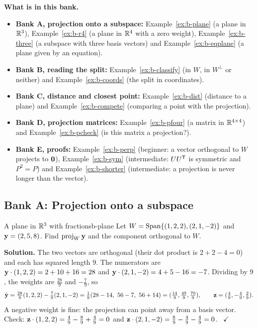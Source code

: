 \documentclass[11pt]{article}
\begin{document}
\textbf{What is in this bank.}
\begin{itemize}
  \item \textbf{Bank A, projection onto a subspace:} Example~\ref{ex:b-plane} (a plane in $\mathbb{R}^3$), Example~\ref{ex:b-r4} (a plane in $\mathbb{R}^4$ with a zero weight), Example~\ref{ex:b-three} (a subspace with three basis vectors) and Example~\ref{ex:b-eqplane} (a plane given by an equation).
  \item \textbf{Bank B, reading the split:} Example~\ref{ex:b-classify} (in $W$, in $W^{\perp}$ or neither) and Example~\ref{ex:b-coords} (the split in coordinates).
  \item \textbf{Bank C, distance and closest point:} Example~\ref{ex:b-dist} (distance to a plane) and Example~\ref{ex:b-compete} (comparing a point with the projection).
  \item \textbf{Bank D, projection matrices:} Example~\ref{ex:b-pfour} (a matrix in $\mathbb{R}^{4\times4}$) and Example~\ref{ex:b-pcheck} (is this matrix a projection?).
  \item \textbf{Bank E, proofs:} Example~\ref{ex:b-perp} (beginner: a vector orthogonal to $W$ projects to $\mathbf{0}$), Example~\ref{ex:b-sym} (intermediate: $UU^{\mathsf T}$ is symmetric and $P^2=P$) and Example~\ref{ex:b-shorter} (intermediate: a projection is never longer than the vector).
\end{itemize}

\subsection*{Bank A: Projection onto a subspace}
\begin{exmp}{A plane in $\mathbb{R}^3$ with fractions}{b-plane}
Let $W=\operatorname{Span}\{(1,2,2),(2,1,-2)\}$ and $\mathbf{y}=(2,5,8)$. Find $\operatorname{proj}_W\mathbf{y}$ and the component orthogonal to $W$.

\textbf{Solution.} The two vectors are orthogonal (their dot product is $2+2-4=0$) and each has squared length $9$. The numerators are $\mathbf{y}\cdot(1,2,2)=2+10+16=28$ and $\mathbf{y}\cdot(2,1,-2)=4+5-16=-7$. Dividing by $9$, the weights are $\tfrac{28}9$ and $-\tfrac79$, so
\[
\hat{\bv{y}}=\tfrac{28}9(1,2,2)-\tfrac79(2,1,-2)=\tfrac19(28-14,\ 56-7,\ 56+14)=(\tfrac{14}9,\tfrac{49}9,\tfrac{70}9),\qquad\bv{z}=(\tfrac49,-\tfrac49,\tfrac29).
\]
A negative weight is fine: the projection can point away from a basis vector. Check: $\mathbf{z}\cdot(1,2,2)=\tfrac49-\tfrac89+\tfrac49=0$ and $\mathbf{z}\cdot(2,1,-2)=\tfrac89-\tfrac49-\tfrac49=0$. \ $\checkmark$
\end{exmp}
\end{document}
